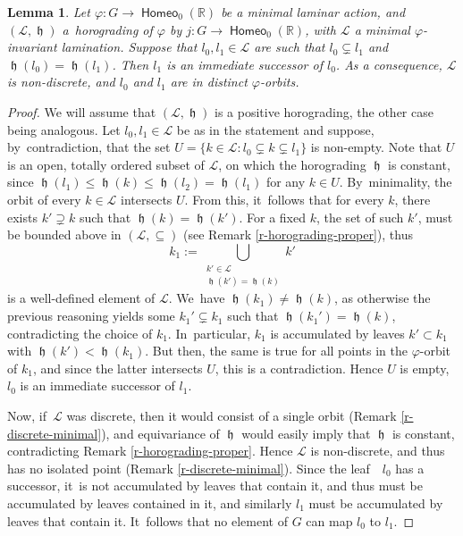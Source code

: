 \documentclass[JEP,XML,SOM,Unicode,NoFloatCountersInSection,published]{cedram}
\newtheorem{lem}[thm]{Lemma}
\theoremstyle{definition}
\DeclareMathOperator{\homeo}{\mathsf{Homeo}}
\DeclareMathOperator{\hor}{\mathfrak{h}}
\newcommand{\R}{\mathbb{R}}
\newcommand{\Lcal}{\mathcal{L}}
\begin{document}
\begin{lem} \label{l-horograding-almost-injective}
Let $\varphi\colon G\to \homeo_0(\R)$ be a minimal laminar action, and $(\Lcal, \hor)$ a~horograding of $\varphi$ by $j\colon G\to \homeo_0(\R)$, with $\Lcal$ a minimal $\varphi$-invariant lamination. Suppose that $l_0,l_1\in \mathcal L$ are such that $l_0\subsetneq l_1$ and $\hor(l_0)=\hor(l_1)$. Then $l_1$ is an immediate successor of $l_0$. As a consequence, $\Lcal$ is non-discrete, and $l_0$ and $l_1$ are in distinct $\varphi$-orbits.
\end{lem}
\begin{proof} We will assume that $(\mathcal L,\hor)$ is a positive horograding, the other case being analogous.
Let $l_0, l_1\in \mathcal L$ be as in the statement and suppose, by~contradiction, that the set $U=\{k\in \Lcal: l_0\subsetneq k\subsetneq l_1\}$ is non-empty. Note that $U$ is an open, totally ordered subset of $\Lcal$, on which the horograding $\hor$ is constant, since $\hor(l_1)\leq \hor(k)\leq \hor(l_2)=\hor(l_1)$ for any $k\in U$. By~minimality, the orbit of every $k\in \Lcal$ intersects $U$. From this, it~follows that for every $k$, there exists $k'\supsetneq k$ such that $\hor(k)=\hor(k')$. For a fixed $k$, the set of such $k'$, must be bounded above in $(\Lcal, \subseteq)$ (see Remark \ref{r-horograding-proper}), thus
\[k_1:=\bigcup_{\substack{k'\in \mathcal L\\ \hor(k')=\hor(k)}}k'
\]
is a well-defined element of $\Lcal$. We~have $\hor(k_1)\neq \hor(k)$, as otherwise the previous reasoning yields some $k_1'\subsetneq k_1$ such that $\hor(k_1')=\hor(k)$, contradicting the choice of $k_1$. In~particular, $k_1$ is accumulated by leaves $k'\subset k_1$ with $\hor(k')<\hor(k_1)$. But then, the same is true for all points in the $\varphi$-orbit of $k_1$, and since the latter intersects $U$, this is a contradiction.
Hence $U$ is empty, \ie $l_0$ is an immediate successor of $l_1$.

Now, if~$\mathcal L$ was discrete, then it would consist of a single orbit (Remark \ref{r-discrete-minimal}), and equivariance of $\hor$ would easily imply that $\hor$ is constant, contradicting Remark \ref{r-horograding-proper}.
Hence $\Lcal$ is non-discrete, and thus has no isolated point (Remark \ref{r-discrete-minimal}). Since the leaf~ $l_0$ has a successor, it~is not accumulated by leaves that contain it, and thus must be accumulated by leaves contained in it, and similarly $l_1$ must be accumulated by leaves that contain it. It~follows that no element of $G$ can map $l_0$ to $l_1$.
\end{proof}
\end{document}
